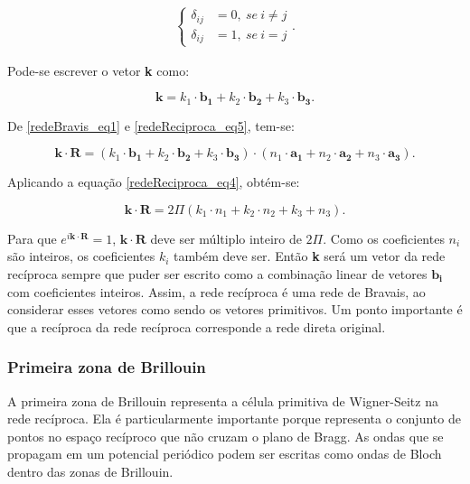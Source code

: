       \begin{align}\label{delta_kronecker_sistema}
        \left\{
          \begin{array}{ll}
            \displaystyle \delta_{ij} &= 0,\ se \ i\neq j\\
            \displaystyle \delta_{ij} &= 1,\ se \ i = j
          \end{array}
        \right.
        .
      \end{align}

      \par Pode-se escrever o vetor \textbf{k} como:

      \begin{equation}\label{redeReciproca_eq5}
        \mathbf{k} = k_{1}\cdot \mathbf{b_{1}} + k_{2}\cdot \mathbf{b_{2}} + k_{3}\cdot \mathbf{b_{3}}.
      \end{equation}

      \par De \eqref{redeBravis_eq1} e \eqref{redeReciproca_eq5}, tem-se:

      \begin{equation}\label{redeReciproca_eq6}
        \mathbf{k} \cdot \mathbf{R} = (k_{1} \cdot \mathbf{b_{1}} + k_{2} \cdot \mathbf{b_{2}} + k_{3} \cdot \mathbf{b_{3}})\cdot(n_{1} \cdot \mathbf{a_{1}} + n_{2} \cdot \mathbf{a_{2}} + n_{3} \cdot \mathbf{a_{3}}).
      \end{equation}

      \par Aplicando a equação \eqref{redeReciproca_eq4}, obtém-se:

      \begin{equation}\label{redeReciproca_eq6}
        \mathbf{k} \cdot \mathbf{R} = 2 \Pi (k_{1} \cdot n_{1} + k_{2} \cdot n_{2} + k_{3} + n_{3}).
      \end{equation}

      \par Para que $e^{i\mathbf{k} \cdot \mathbf{R}} = 1$, $\mathbf{k} \cdot \mathbf{R}$ deve ser múltiplo inteiro de $2 \Pi$. Como os coeficientes $n_{i}$ são inteiros, os coeficientes $k_{i}$ também deve ser. Então \textbf{k} será um vetor da rede recíproca sempre que puder ser escrito como a combinação linear de vetores $\mathbf{b_{i}}$ com coeficientes inteiros. Assim, a rede recíproca é uma rede de Bravais, ao considerar esses vetores como sendo os vetores primitivos. Um ponto importante é que a recíproca da rede recíproca corresponde a rede direta original\cite{qm_fis5}.

    \subsubsection{Primeira zona de Brillouin}

      A primeira zona de Brillouin representa a célula primitiva de Wigner-Seitz na rede recíproca. Ela é particularmente importante porque representa o conjunto de pontos no espaço recíproco que não cruzam o plano de Bragg. As ondas que se propagam em um potencial periódico podem ser escritas como ondas de Bloch dentro das zonas de Brillouin\cite{qm_fis6}.